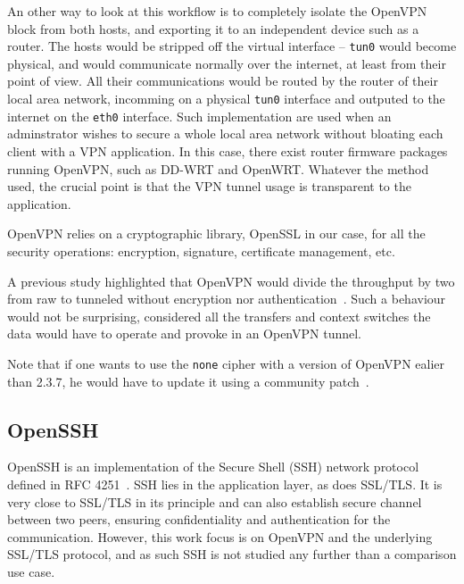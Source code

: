 An other way to look at this workflow is to completely isolate the OpenVPN block from both hosts, and exporting it to an independent device such as a router.
The hosts would be stripped off the virtual interface -- \texttt{tun0} would become physical, and would communicate normally over the internet, at least from their point of view.
All their communications would be routed by the router of their local area network, incomming on a physical \texttt{tun0} interface and outputed to the internet on the \texttt{eth0} interface.
Such implementation are used when an adminstrator wishes to secure a whole local area network without bloating each client with a VPN application.
In this case, there exist router firmware packages running OpenVPN, such as DD-WRT and OpenWRT.
Whatever the method used, the crucial point is that the VPN tunnel usage is transparent to the application.\newline{}

OpenVPN relies on a cryptographic library, OpenSSL in our case, for all the security operations: encryption, signature, certificate management, etc.\newline{}

A previous study highlighted that OpenVPN would divide the throughput by two from raw to tunneled without encryption nor authentication~\cite{Hoekstra2011}.
Such a behaviour would not be surprising, considered all the transfers and context switches the data would have to operate and provoke in an OpenVPN tunnel.

\noindent Note that if one wants to use the \texttt{none} cipher with a version of OpenVPN ealier than 2.3.7, he would have to update it using a community patch~\cite{openvpn-patch-none}.


\subsection{OpenSSH}
OpenSSH is an implementation of the Secure Shell (SSH) network protocol defined in RFC 4251~\cite{rfc4251}.
SSH lies in the application layer, as does SSL/TLS.
It is very close to SSL/TLS in its principle and can also establish secure channel between two peers, ensuring confidentiality and authentication for the communication.
However, this work focus is on OpenVPN and the underlying SSL/TLS protocol, and as such SSH is not studied any further than a comparison use case.\newline{}

